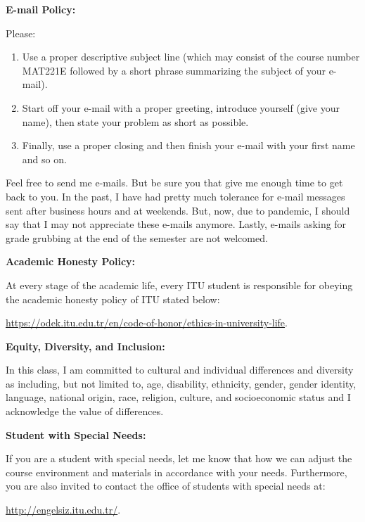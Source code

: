 \documentclass[
  12pt,
]{article}
\providecommand{\tightlist}{%
  \setlength{\itemsep}{0pt}\setlength{\parskip}{0pt}}
\begin{document}
\textbf{E-mail Policy:}

Please:

\begin{enumerate}
\def\labelenumi{\arabic{enumi}.}
\tightlist
\item
  Use a proper descriptive subject line (which may consist of the course
  number MAT221E followed by a short phrase summarizing the subject of
  your e-mail).
\item
  Start off your e-mail with a proper greeting, introduce yourself (give
  your name), then state your problem as short as possible.
\item
  Finally, use a proper closing and then finish your e-mail with your
  first name and so on.
\end{enumerate}

Feel free to send me e-mails. But be sure you that give me enough time
to get back to you. In the past, I have had pretty much tolerance for
e-mail messages sent after business hours and at weekends. But, now, due
to pandemic, I should say that I may not appreciate these e-mails
anymore. Lastly, e-mails asking for grade grubbing at the end of the
semester are not welcomed.

\textbf{Academic Honesty Policy:}

At every stage of the academic life, every ITU student is responsible
for obeying the academic honesty policy of ITU stated below:

\url{https://odek.itu.edu.tr/en/code-of-honor/ethics-in-university-life}.

\textbf{Equity, Diversity, and Inclusion:}

In this class, I am committed to cultural and individual differences and
diversity as including, but not limited to, age, disability, ethnicity,
gender, gender identity, language, national origin, race, religion,
culture, and socioeconomic status and I acknowledge the value of
differences.

\textbf{Student with Special Needs:}

If you are a student with special needs, let me know that how we can
adjust the course environment and materials in accordance with your
needs. Furthermore, you are also invited to contact the office of
students with special needs at:

\url{http://engelsiz.itu.edu.tr/}.
\end{document}
